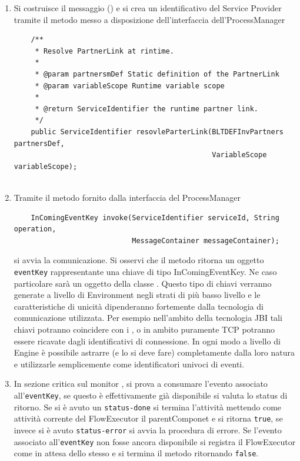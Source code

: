 \begin{enumerate}
  \item Si costruisce il messaggio () e si crea un
  identificativo del Service Provider tramite il metodo messo a disposizione
  dell'interfaccia dell'ProcessManager
  \lstset{frame=NONE,}
  \begin{lstlisting}
  	/**
     * Resolve PartnerLink at rintime.
     * 
     * @param partnersmDef Static definition of the PartnerLink
     * @param variableScope Runtime variable scope
     * 
     * @return ServiceIdentifier the runtime partner link.
     */
    public ServiceIdentifier resovleParterLink(BLTDEFInvPartners partnersDef, 
											   VariableScope variableScope);
    
  \end{lstlisting}  
  
  \item Tramite il metodo fornito dalla interfaccia del ProcessManager
  \begin{lstlisting}
  	InComingEventKey invoke(ServiceIdentifier serviceId, String operation, 
							MessageContainer messageContainer);
  \end{lstlisting}
  si avvia la comunicazione. Si osservi che il metodo ritorna un oggetto
  \texttt{eventKey} rappresentante una chiave di tipo InComingEventKey. 
  Ne caso particolare sarà un oggetto della classe
  . Questo tipo di chiavi verranno generate a
 livello di Environment negli strati di più basso livello e le
 caratteristiche di unicità dipenderanno fortemente dalla tecnologia di comunicazione
 utilizzata. Per esempio nell'ambito della tecnologia JBI tali chiavi potranno
 coincidere con i , o in ambito puramente TCP potranno
 essere ricavate dagli identificativi di connessione. In ogni modo a livello di Engine
 \`e possibile astrarre (e lo si deve fare) completamente dalla loro natura e
 utilizzarle semplicemente come identificatori univoci di eventi.
  
  \item In sezione critica sul monitor , si
  prova a consumare l'evento associato all'\texttt{eventKey}, se questo \`e
  effettivamente già disponibile si valuta lo status di ritorno. Se si \`e
  avuto un \texttt{status-done} si termina l'attività mettendo come
  attività corrente del FlowExecutor il parentComponet e si ritorna
  \texttt{true}, se invece si \`e avuto \texttt{status-error} si avvia la
  procedura di errore. Se l'evento associato all'\texttt{eventKey} non fosse
  ancora disponibile si registra il FlowExecutor come in attesa dello stesso e
  si termina il metodo  ritornando \texttt{false}.
  

\end{enumerate}
